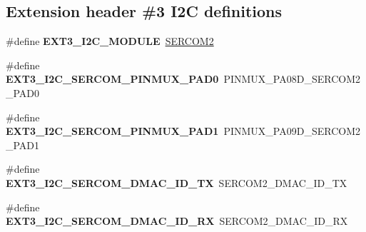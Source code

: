 \subsection*{Extension header \#3 I2\+C definitions}
\begin{DoxyCompactItemize}
\item 
\hypertarget{group__saml21__xplained__pro__features__group_ga2f282089eefa035e3a0c1adf3b7fed43}{}\#define {\bfseries E\+X\+T3\+\_\+\+I2\+C\+\_\+\+M\+O\+D\+U\+L\+E}~\hyperlink{group___s_a_m_l21_j18_a__base_ga918e4c85993961a115bb23b4bb73a87f}{S\+E\+R\+C\+O\+M2}\label{group__saml21__xplained__pro__features__group_ga2f282089eefa035e3a0c1adf3b7fed43}

\item 
\hypertarget{group__saml21__xplained__pro__features__group_ga197dff44b37ec441073abbccc50149c4}{}\#define {\bfseries E\+X\+T3\+\_\+\+I2\+C\+\_\+\+S\+E\+R\+C\+O\+M\+\_\+\+P\+I\+N\+M\+U\+X\+\_\+\+P\+A\+D0}~P\+I\+N\+M\+U\+X\+\_\+\+P\+A08\+D\+\_\+\+S\+E\+R\+C\+O\+M2\+\_\+\+P\+A\+D0\label{group__saml21__xplained__pro__features__group_ga197dff44b37ec441073abbccc50149c4}

\item 
\hypertarget{group__saml21__xplained__pro__features__group_ga38d55a0120c9521f025a60b2fa34b2ad}{}\#define {\bfseries E\+X\+T3\+\_\+\+I2\+C\+\_\+\+S\+E\+R\+C\+O\+M\+\_\+\+P\+I\+N\+M\+U\+X\+\_\+\+P\+A\+D1}~P\+I\+N\+M\+U\+X\+\_\+\+P\+A09\+D\+\_\+\+S\+E\+R\+C\+O\+M2\+\_\+\+P\+A\+D1\label{group__saml21__xplained__pro__features__group_ga38d55a0120c9521f025a60b2fa34b2ad}

\item 
\hypertarget{group__saml21__xplained__pro__features__group_ga6ed2ba04435c4c3b78e869e985f6fc5e}{}\#define {\bfseries E\+X\+T3\+\_\+\+I2\+C\+\_\+\+S\+E\+R\+C\+O\+M\+\_\+\+D\+M\+A\+C\+\_\+\+I\+D\+\_\+\+T\+X}~S\+E\+R\+C\+O\+M2\+\_\+\+D\+M\+A\+C\+\_\+\+I\+D\+\_\+\+T\+X\label{group__saml21__xplained__pro__features__group_ga6ed2ba04435c4c3b78e869e985f6fc5e}

\item 
\hypertarget{group__saml21__xplained__pro__features__group_gaba7bf394d683a2a1cce88c6160c661b7}{}\#define {\bfseries E\+X\+T3\+\_\+\+I2\+C\+\_\+\+S\+E\+R\+C\+O\+M\+\_\+\+D\+M\+A\+C\+\_\+\+I\+D\+\_\+\+R\+X}~S\+E\+R\+C\+O\+M2\+\_\+\+D\+M\+A\+C\+\_\+\+I\+D\+\_\+\+R\+X\label{group__saml21__xplained__pro__features__group_gaba7bf394d683a2a1cce88c6160c661b7}

\end{DoxyCompactItemize}
